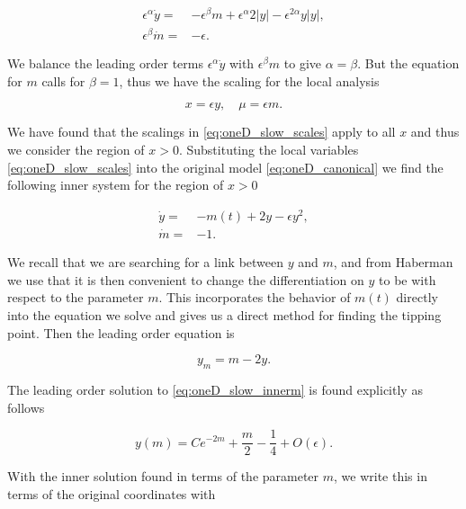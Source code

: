 \begin{equation}\label{eq:oneD_slow_scalesearch}
\begin{aligned}
\epsilon^\alpha \dot{y}=&-\epsilon^\beta m +\epsilon^\alpha 2|y|-\epsilon^{2\alpha}y|y|,\\
 \epsilon^\beta \dot{m}=&-\epsilon.
\end{aligned}
\end{equation}

We balance the leading order terms $\epsilon^\alpha\dot{y}$ with $\epsilon^\beta m$ to give $\alpha=\beta$. But the equation for $m$ calls for $\beta=1$, thus we have the scaling for the local analysis

\begin{equation}\label{eq:oneD_slow_scales}
x=\epsilon y,\quad \mu=\epsilon m.
\end{equation}

We have found that the scalings in \eqref{eq:oneD_slow_scales} apply to all $x$ and thus we consider the region of $x>0$. Substituting the local variables \eqref{eq:oneD_slow_scales} into the original model \eqref{eq:oneD_canonical} we find the following inner system for the region of $x>0$

\begin{equation}\label{eq:oneD_slow_innereq}
\begin{aligned}
\dot{y}=&-m(t)+2 y-\epsilon y^2,\\
\dot{m}=&-1.
\end{aligned}
\end{equation}

We recall that we are searching for a link between $y$ and $m$, and from Haberman \cite{haberman1979slowly} we use that it is then convenient to change the differentiation on $y$ to be with respect to the parameter $m$. This incorporates the behavior of $m(t)$ directly into the equation we solve and gives us a direct method for finding the tipping point. Then the leading order equation is

\begin{equation}\label{eq:oneD_slow_innerm}
y_m = m-2y.
\end{equation}

The leading order solution to \eqref{eq:oneD_slow_innerm} is found explicitly as follows

\begin{equation*}
y(m) = C e^{-2m}+\frac{m}{2}-\frac{1}{4}+O(\epsilon).
\end{equation*}

With the inner solution found in terms of the parameter $m$, we write this in terms of the original coordinates with

